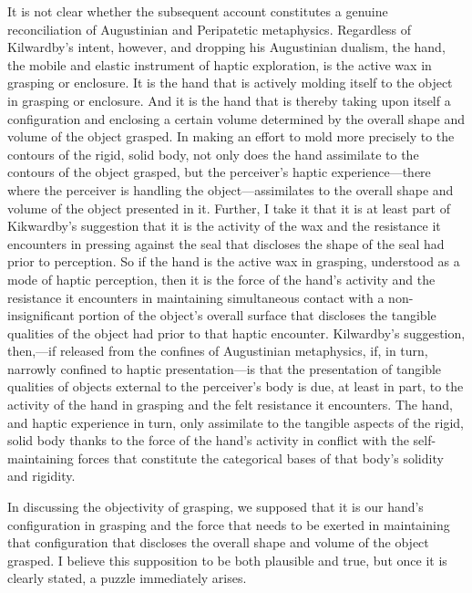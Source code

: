 \documentclass[12pt]{article}
\begin{document}
It is not clear whether the subsequent account constitutes a genuine reconciliation of Augustinian and Peripatetic metaphysics. Regardless of Kilwardby's intent, however, and dropping his Augustinian dualism, the hand, the mobile and elastic instrument of haptic exploration, is the active wax in grasping or enclosure. It is the hand that is actively molding itself to the object in grasping or enclosure. And it is the hand that is thereby taking upon itself a configuration and enclosing a certain volume determined by the overall shape and volume of the object grasped. In making an effort to mold more precisely to the contours of the rigid, solid body, not only does the hand assimilate to the contours of the object grasped, but the perceiver's haptic experience---there where the perceiver is handling the object---assimilates to the overall shape and volume of the object presented in it. Further, I take it that it is at least part of Kikwardby's suggestion that it is the activity of the wax and the resistance it encounters in pressing against the seal that discloses the shape of the seal had prior to perception. So if the hand is the active wax in grasping, understood as a mode of haptic perception, then it is the force of the hand's activity and the resistance it encounters in maintaining simultaneous contact with a non-insignificant portion of the object's overall surface that discloses the tangible qualities of the object had prior to that haptic encounter. Kilwardby's suggestion, then,---if released from the confines of Augustinian metaphysics, if, in turn, narrowly confined to haptic presentation---is that the presentation of tangible qualities of objects external to the perceiver's body is due, at least in part, to the activity of the hand in grasping and the felt resistance it encounters. The hand, and haptic experience in turn, only assimilate to the tangible aspects of the rigid, solid body thanks to the force of the hand's activity in conflict with the self-maintaining forces that constitute the categorical bases of that body's solidity and rigidity.

In discussing the objectivity of grasping, we supposed that it is our hand's configuration in grasping and the force that needs to be exerted in maintaining that configuration that discloses the overall shape and volume of the object grasped. I believe this supposition to be both plausible and true, but once it is clearly stated, a puzzle immediately arises. 
\end{document}
